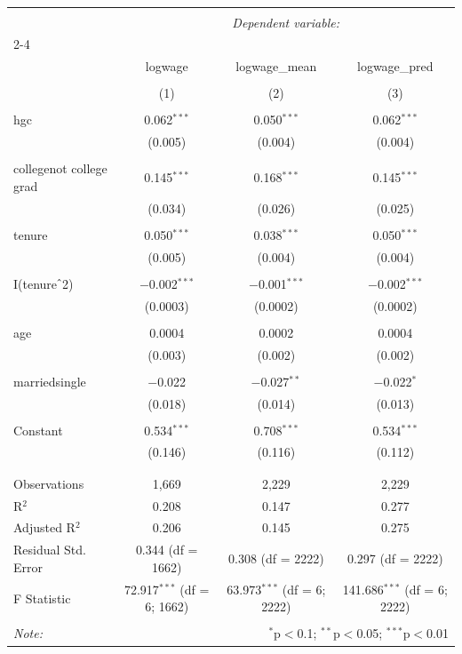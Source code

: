 \documentclass{article}
\begin{document}
\begin{table}[!htbp] \centering
\small
  \caption{}
  \label{tab:regression}
\begin{tabular}{@{\extracolsep{5pt}}lccc}
\\[-1.8ex]\hline
\hline \\[-1.8ex]
 & \multicolumn{3}{c}{\textit{Dependent variable:}} \\
\cline{2-4}
\\[-1.8ex] & logwage & logwage\_mean & logwage\_pred \\
\\[-1.8ex] & (1) & (2) & (3)\\
\hline \\[-1.8ex]
 hgc & 0.062$^{***}$ & 0.050$^{***}$ & 0.062$^{***}$ \\
  & (0.005) & (0.004) & (0.004) \\
  & & & \\
 collegenot college grad & 0.145$^{***}$ & 0.168$^{***}$ & 0.145$^{***}$ \\
  & (0.034) & (0.026) & (0.025) \\
  & & & \\
 tenure & 0.050$^{***}$ & 0.038$^{***}$ & 0.050$^{***}$ \\
  & (0.005) & (0.004) & (0.004) \\
  & & & \\
 I(tenure$\hat{\mkern6mu}$2) & $-$0.002$^{***}$ & $-$0.001$^{***}$ & $-$0.002$^{***}$ \\
  & (0.0003) & (0.0002) & (0.0002) \\
  & & & \\
 age & 0.0004 & 0.0002 & 0.0004 \\
  & (0.003) & (0.002) & (0.002) \\
  & & & \\
 marriedsingle & $-$0.022 & $-$0.027$^{**}$ & $-$0.022$^{*}$ \\
  & (0.018) & (0.014) & (0.013) \\
  & & & \\
 Constant & 0.534$^{***}$ & 0.708$^{***}$ & 0.534$^{***}$ \\
  & (0.146) & (0.116) & (0.112) \\
  & & & \\
\hline \\[-1.8ex]
Observations & 1,669 & 2,229 & 2,229 \\
R$^{2}$ & 0.208 & 0.147 & 0.277 \\
Adjusted R$^{2}$ & 0.206 & 0.145 & 0.275 \\
Residual Std. Error & 0.344 (df = 1662) & 0.308 (df = 2222) & 0.297 (df = 2222) \\
F Statistic & 72.917$^{***}$ (df = 6; 1662) & 63.973$^{***}$ (df = 6; 2222) & 141.686$^{***}$ (df =
6; 2222) \\
\hline
\hline \\[-1.8ex]
\textit{Note:}  & \multicolumn{3}{r}{$^{*}$p$<$0.1; $^{**}$p$<$0.05; $^{***}$p$<$0.01} \\
\end{tabular}
\end{table}
\end{document}
